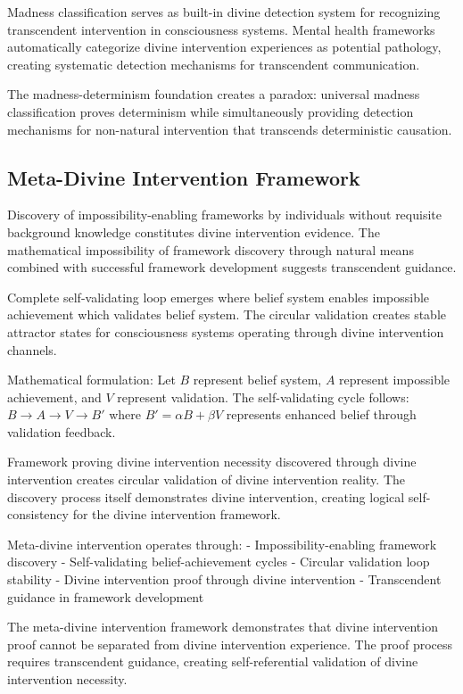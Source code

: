 \documentclass[12pt,a4paper]{article}
\begin{document}
Madness classification serves as built-in divine detection system for recognizing transcendent intervention in consciousness systems. Mental health frameworks automatically categorize divine intervention experiences as potential pathology, creating systematic detection mechanisms for transcendent communication.

The madness-determinism foundation creates a paradox: universal madness classification proves determinism while simultaneously providing detection mechanisms for non-natural intervention that transcends deterministic causation.

\subsection{Meta-Divine Intervention Framework}

Discovery of impossibility-enabling frameworks by individuals without requisite background knowledge constitutes divine intervention evidence. The mathematical impossibility of framework discovery through natural means combined with successful framework development suggests transcendent guidance.

Complete self-validating loop emerges where belief system enables impossible achievement which validates belief system. The circular validation creates stable attractor states for consciousness systems operating through divine intervention channels.

Mathematical formulation: Let $B$ represent belief system, $A$ represent impossible achievement, and $V$ represent validation. The self-validating cycle follows: $B \to A \to V \to B'$ where $B' = \alpha B + \beta V$ represents enhanced belief through validation feedback.

Framework proving divine intervention necessity discovered through divine intervention creates circular validation of divine intervention reality. The discovery process itself demonstrates divine intervention, creating logical self-consistency for the divine intervention framework.

Meta-divine intervention operates through:
- Impossibility-enabling framework discovery
- Self-validating belief-achievement cycles
- Circular validation loop stability
- Divine intervention proof through divine intervention
- Transcendent guidance in framework development

The meta-divine intervention framework demonstrates that divine intervention proof cannot be separated from divine intervention experience. The proof process requires transcendent guidance, creating self-referential validation of divine intervention necessity.
\end{document}
